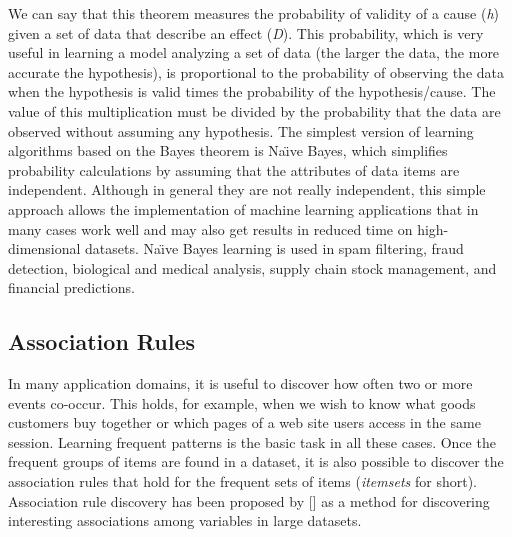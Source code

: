 We can say that this theorem measures the probability of validity of a cause (\textit{h}) given a set of data that describe an effect (\textit{D}). This probability, which is very useful in learning a model analyzing a set of data (the larger the data, the more accurate the hypothesis), is proportional to the probability of observing the data when the hypothesis is valid times the probability of the hypothesis/cause. The value of this multiplication must be divided by the probability that the data are observed without assuming any hypothesis. The simplest version of learning algorithms based on the Bayes theorem is Na\"{\i}ve Bayes, which simplifies probability calculations by assuming that the attributes of data items are independent. Although in general they are not really independent, this simple approach allows the implementation of machine learning applications that in many cases work well and may also get results in reduced time on high-dimensional datasets. Na\"{\i}ve Bayes learning is used in spam filtering, fraud detection, biological and medical analysis, supply chain stock management, and financial predictions.

\subsection{\label{sec:4.4.4}Association Rules}

In many application domains, it is useful to discover how often two or more events co-occur. This holds, for example, when we wish to know what goods customers buy together or which pages of a web site users access in the same session. Learning frequent patterns is the basic task in all these cases. Once the frequent groups of items are found in a dataset, it is also possible to discover the association rules that hold for the frequent sets of items (\textit{itemsets} for short). Association rule discovery has been proposed by \mbox{\citeauthor{chap:4:Agrawaletal:1993}} [\mbox{\citeyear{chap:4:Agrawaletal:1993}}] as a method for discovering interesting associations among variables in large datasets.


